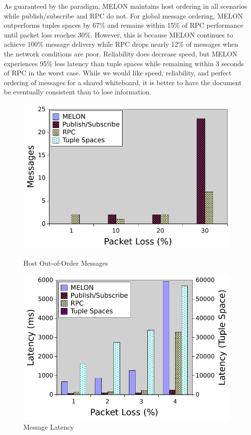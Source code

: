 \documentclass{llncs}
\begin{document}
As guaranteed by the paradigm, MELON maintains host ordering in all scenarios while publish/subscribe and RPC do not. For global message ordering, MELON outperforms tuples spaces by 67\% and remains within 15\% of RPC performance until packet loss reaches 30\%. However, this is because MELON continues to achieve 100\% message delivery while RPC drops nearly 12\% of messages when the network conditions are poor. Reliability does decrease speed, but MELON experiences 95\% less latency than tuple spaces while remaining within 3 seconds of RPC in the worst case. While we would like speed, reliability, and perfect ordering of messages for a shared whiteboard, it is better to have the document be eventually consistent than to lose information.

\begin{figure}[ht]
\centering
\begin{minipage}[b]{0.48\linewidth}
\includegraphics[width = \textwidth]{figures/hooo.pdf}
\caption{Host Out-of-Order Messages}
\label{fig:hooo}
\end{minipage}
\quad
\begin{minipage}[b]{0.48\linewidth}
\includegraphics[width = \textwidth]{figures/latency.pdf}
\caption{Message Latency}
\label{fig:latency}
\end{minipage}
\end{figure}
\end{document}
